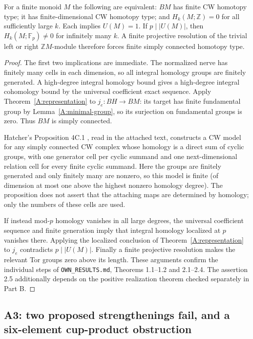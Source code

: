 \begin{theorem}\label{A:bounded}
For a finite monoid $M$ the following are equivalent: $BM$ has finite CW
homotopy type; it has finite-dimensional CW homotopy type; and
$H_k(M;\mathbb Z)=0$ for all sufficiently large $k$. Each implies $U(M)=1$.
If $p\mid |U(M)|$, then $H_k(M;\mathbb F_p)\ne0$ for infinitely many $k$.
A finite projective resolution of the trivial left or right $\mathbb ZM$-module
therefore forces finite simply connected homotopy type.
\end{theorem}
\begin{proof}
The first two implications are immediate. The normalized nerve has finitely
many cells in each dimension, so all integral homology groups are finitely
generated. A high-degree integral homology bound gives a high-degree integral
cohomology bound by the universal coefficient exact sequence. Apply
Theorem~\ref{A:representation} to $j_e:BH\to BM$: its target has finite
fundamental group by Lemma~\ref{A:minimal-group}, so its surjection on
fundamental groups is zero. Thus $BM$ is simply connected.

Hatcher's Proposition 4C.1 \cite[pp.~429--430]{hatcher2002}, read in the attached text,
constructs a CW model for any simply connected CW complex whose homology is
a direct sum of cyclic groups, with one generator cell per cyclic summand
and one next-dimensional relation cell for every finite cyclic summand.
Here the groups are finitely generated and only finitely many are nonzero,
so this model is finite (of dimension at most one above the highest nonzero
homology degree). The proposition does not assert that the attaching maps
are determined by homology; only the numbers of these cells are used.

If instead mod-$p$ homology vanishes in all large degrees, the universal
coefficient sequence and finite generation imply that integral homology
localized at $p$ vanishes there. Applying the localized conclusion of
Theorem~\ref{A:representation} to $j_e$ contradicts $p\mid |U(M)|$.
Finally a finite projective resolution makes the relevant Tor groups zero
above its length. These arguments confirm the individual steps of
\texttt{OWN\_RESULTS.md}, Theorems 1.1--1.2 and 2.1--2.4.
The assertion 2.5 additionally depends on the positive realization theorem
checked separately in Part B.
\end{proof}

\subsection{A3: two proposed strengthenings fail, and a six-element cup-product obstruction}

